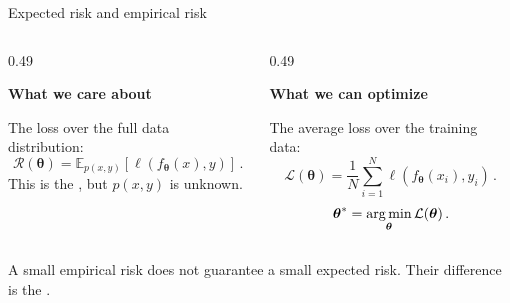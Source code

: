 \documentclass[12pt,aspectratio=169]{beamer}
\begin{document}
\begin{frame}{Expected risk and empirical risk}

	\small
	\begin{columns}[T,onlytextwidth]
		\begin{column}{0.49\textwidth}
			\begin{tcolorbox}[nndsgreen,height=0.61\textheight]
				\textbf{\color{darkgreen}What we care about}

				The loss over the full data distribution:
				\begin{equation}
					\mathcal{R}(\boldsymbol{\theta})
					=\mathbb{E}_{p(x,y)}\!\left[
					\ell\left(f_{\boldsymbol{\theta}}(x),y\right)\right] \,.
				\end{equation}
				This is the , but $p(x,y)$ is unknown.
			\end{tcolorbox}
		\end{column}
		\begin{column}{0.49\textwidth}
			\begin{tcolorbox}[nndsblue,height=0.61\textheight]
				\textbf{\color{darkcerulean}What we can optimize}

				The average loss over the training data:
				\begin{equation}
					\mathcal{L}(\boldsymbol{\theta})
					=\frac{1}{N}\sum_{i=1}^{N}
					\ell\left(f_{\boldsymbol{\theta}}(x_i),y_i\right) \,.
				\end{equation}
				\begin{equation}
					\boldsymbol{\theta}^*
					=\operatorname*{arg\,min}_{\boldsymbol{\theta}}\mathcal{L}(\boldsymbol{\theta}) \,.
				\end{equation}
			\end{tcolorbox}
		\end{column}
	\end{columns}

	\begin{tcolorbox}[nndsorange,boxsep=1mm,top=1mm,bottom=1mm]
		A small empirical risk does not guarantee a small expected risk. Their difference is the .
	\end{tcolorbox}
	
\end{frame}
\end{document}
